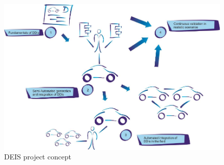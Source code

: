 
\begin{figure}[ht!]
	\centering
	\includegraphics[width=1\linewidth]{./fig/proj_concept.pdf}
	\caption{DEIS project concept}
	\label{fig:proj_concept}
\end{figure}


